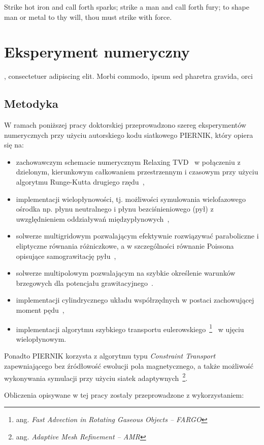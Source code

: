 \begin{savequote}[75mm]
Strike hot iron and call forth sparks; strike a man and call forth fury; to shape man or metal to thy will, thou must
strike with force.
\end{savequote}

\chapter{Eksperyment numeryczny}
, consectetuer adipiscing elit. Morbi commodo, ipsum sed pharetra gravida, orci
\section{Metodyka}
W ramach poniższej pracy doktorskiej przeprowadzono szereg eksperymentów
numerycznych przy użyciu autorskiego kodu siatkowego PIERNIK, który opiera się
na:
\begin{itemize}
   \item zachowawczym schemacie numerycznym Relaxing TVD~\cite{jin-xin-95} w
      połączeniu z dzielonym, kierunkowym całkowaniem przestrzennym i czasowym
      przy użyciu algorytmu Runge-Kutta drugiego
      rzędu~\cite{2003PASP..115..303T,2003ApJS..149..447P},
   \item implementacji wielopłynowości, tj. możliwości symulowania wielofazowego
      ośrodka np. płynu neutralnego i płynu bezciśnieniowego (pył) z
      uwzględnieniem oddziaływań międzypłynowych~\cite{piernik1,piernik2},
   \item solwerze multigridowym pozwalającym efektywnie rozwiązywać paraboliczne
      i eliptyczne równania różniczkowe, a w szczególności równanie Poissona
      opisujące samograwitację pyłu~\citep{HG00},
   \item solwerze multipolowym pozwalającym na szybkie określenie warunków
      brzegowych dla potencjału grawitacyjnego~\citep{J77}.
   \item implementacji cylindrycznego układu współrzędnych w postaci
      zachowującej moment pędu~\cite{M07,SO10},
   \item implementacji algorytmu szybkiego transportu
      eulerowskiego~\footnote{ang. \emph{Fast Advection in Rotating Gaseous Objects --
      FARGO}}~\citep{M00} w ujęciu wielopłynowym.

\end{itemize}
Ponadto PIERNIK korzysta z algorytmu typu \emph{Constraint
Transport}~\cite{EH88} zapewniającego bez źródłowość ewolucji pola
magnetycznego, a także możliwość wykonywania symulacji przy użyciu siatek
adaptywnych~\footnote{ang.  \emph{Adaptive Mesh Refinement -- AMR}}.  
%
\par Obliczenia opisywane w tej pracy zostały przeprowadzone z wykorzystaniem:

